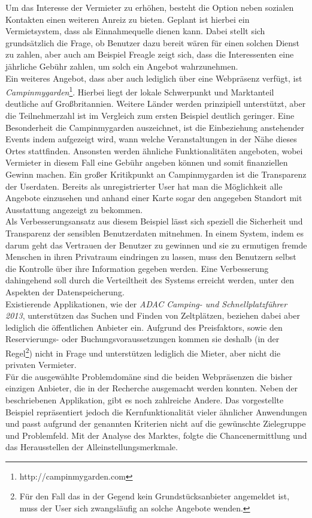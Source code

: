     Um das Interesse der Vermieter zu erhöhen, besteht die Option neben sozialen Kontakten einen weiteren Anreiz zu bieten. Geplant ist hierbei ein Vermietsystem, dass als Einnahmequelle dienen kann. Dabei stellt sich grundsätzlich die Frage, ob Benutzer dazu bereit wären für einen solchen Dienst zu zahlen, aber auch am Beispiel Freagle zeigt sich, dass die Interessenten eine jährliche Gebühr zahlen, um solch ein Angebot wahrzunehmen.\\
    
    Ein weiteres Angebot, dass aber auch lediglich über eine Webpräsenz verfügt, ist \textit{Campinmygarden}\footnote{http://campinmygarden.com}. Hierbei liegt der lokale Schwerpunkt und Marktanteil deutliche auf Großbritannien. Weitere Länder werden prinzipiell unterstützt, aber die Teilnehmerzahl ist im Vergleich zum ersten Beispiel deutlich geringer.
    Eine Besonderheit die Campinmygarden auszeichnet, ist die Einbeziehung anstehender Events indem aufgezeigt wird, wann welche Veranstaltungen in der Nähe dieses Ortes stattfinden. Ansonsten werden ähnliche Funktionalitäten angeboten, wobei Vermieter in diesem Fall eine Gebühr angeben können und somit finanziellen Gewinn machen. Ein großer Kritikpunkt an Campinmygarden ist die Transparenz der Userdaten. Bereits als unregistrierter User hat man die Möglichkeit alle Angebote einzusehen und anhand einer Karte sogar den angegeben Standort mit Ausstattung angezeigt zu bekommen.\\
    Als Verbesserungsansatz aus diesem Beispiel lässt sich speziell die Sicherheit und Transparenz der sensiblen Benutzerdaten mitnehmen. 
    In einem System, indem es darum geht das Vertrauen der Benutzer zu gewinnen und sie zu ermutigen fremde Menschen in ihren Privatraum eindringen zu lassen, muss den Benutzern selbst die Kontrolle über ihre Information gegeben werden. Eine Verbesserung dahingehend soll durch die Verteiltheit des Systems erreicht werden, unter den Aspekten der Datenspeicherung. \\

    Existierende Applikationen, wie der \textit{ADAC Camping- und Schnellplatzführer 2013}, unterstützen das Suchen und Finden von Zeltplätzen, beziehen dabei aber lediglich die öffentlichen Anbieter ein. Aufgrund des Preisfaktors, sowie den Reservierungs- oder Buchungsvoraussetzungen kommen sie deshalb (in der Regel\footnote{Für den Fall das in der Gegend kein Grundstücksanbieter angemeldet ist, muss der User sich zwangsläufig an solche Angebote wenden. }) nicht in Frage und unterstützen lediglich die Mieter, aber nicht die privaten Vermieter.\\

    Für die ausgewählte Problemdomäne sind die beiden Webpräsenzen die bisher einzigen Anbieter, die in der Recherche ausgemacht werden konnten. Neben der beschriebenen Applikation, gibt es noch zahlreiche Andere. Das vorgestellte Beispiel repräsentiert jedoch die Kernfunktionalität vieler ähnlicher Anwendungen und passt aufgrund der genannten Kriterien nicht auf die gewünschte Zielegruppe und Problemfeld. 
    Mit der Analyse des Marktes, folgte die Chancenermittlung und das Herausstellen der Alleinstellungsmerkmale.

